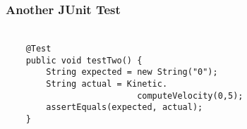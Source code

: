 
\begin{frame}[fragile]
  \frametitle{\vspace*{.5in}Another JUnit Test}
  \framesubtitle{}

  \normalsize
  \hspace*{-.65in}
  \begin{minipage}{5in}
    \Large
    \vspace*{-.25in}
    \begin{verbatim}

    @Test
    public void testTwo() {
        String expected = new String("0");
        String actual = Kinetic.
                          computeVelocity(0,5);
        assertEquals(expected, actual);
    }

    \end{verbatim}
  \end{minipage}
  \normalsize

\end{frame}
